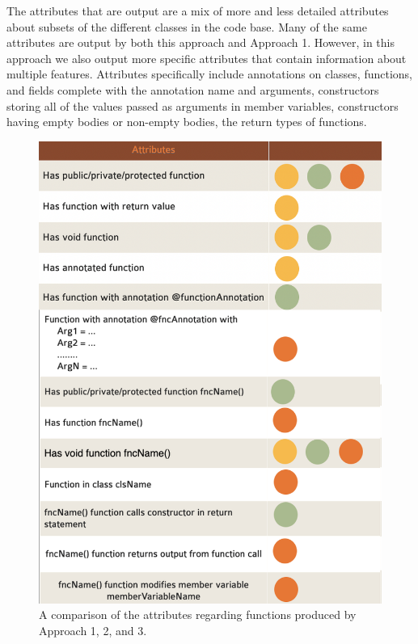 \documentclass[12pt]{article}
\begin{document}
	The attributes that are output are a mix of more and less detailed attributes about subsets of the different classes in the code base. Many of the same attributes are output by both this approach and Approach 1. However, in this approach we also output more specific attributes that contain information about multiple features. Attributes specifically include annotations on classes, functions, and fields complete with the annotation name and arguments, constructors storing all of the values passed as arguments in member variables, constructors having empty bodies or non-empty bodies, the return types of functions. 
	


\begin{figure}
\centering
\parbox{8 cm}{
\includegraphics[width=\linewidth]{attributeFunctions.png}
\caption{A comparison of the attributes regarding functions produced by Approach 1, 2, and 3.}
\label{fig:attrFunction}}
\qquad
\begin{minipage}{7.5 cm}

\end{minipage}
\end{figure}
\end{document}
